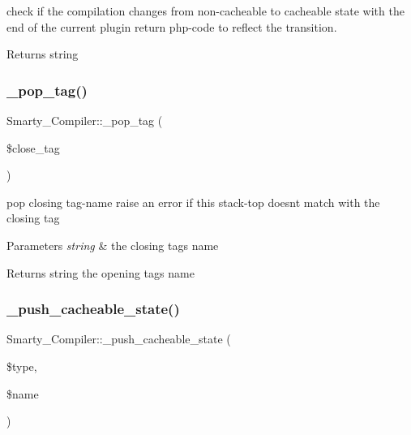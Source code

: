 check if the compilation changes from non-\/cacheable to cacheable state with the end of the current plugin return php-\/code to reflect the transition. \begin{DoxyReturn}{Returns}
string 
\end{DoxyReturn}
\mbox{\label{class_smarty___compiler_a17a75d1aa9db594013757d6a829436a9}} 
\subsubsection{\texorpdfstring{\+\_\+pop\+\_\+tag()}{\_pop\_tag()}}
{\footnotesize\ttfamily Smarty\+\_\+\+Compiler\+::\+\_\+pop\+\_\+tag (\begin{DoxyParamCaption}\item[{}]{\$close\+\_\+tag }\end{DoxyParamCaption})}

pop closing tag-\/name raise an error if this stack-\/top doesn\textquotesingle{}t match with the closing tag 
\begin{DoxyParams}{Parameters}
{\em string} & the closing tag\textquotesingle{}s name \\
\hline
\end{DoxyParams}
\begin{DoxyReturn}{Returns}
string the opening tag\textquotesingle{}s name 
\end{DoxyReturn}
\mbox{\label{class_smarty___compiler_aecdd6b87ba3fdd6efb84b56c5e4dde17}} 
\subsubsection{\texorpdfstring{\+\_\+push\+\_\+cacheable\+\_\+state()}{\_push\_cacheable\_state()}}
{\footnotesize\ttfamily Smarty\+\_\+\+Compiler\+::\+\_\+push\+\_\+cacheable\+\_\+state (\begin{DoxyParamCaption}\item[{}]{\$type,  }\item[{}]{\$name }\end{DoxyParamCaption})}

